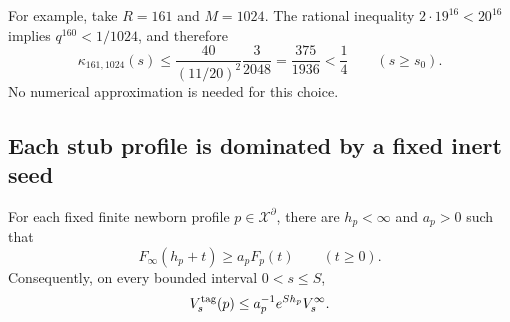 For example, take $R=161$ and $M=1024$.  The rational inequality
$2\cdot19^{16}<20^{16}$ implies $q^{160}<1/1024$, and therefore
\[
 \kappa_{161,1024}(s)
 \le\frac{40}{(11/20)^2}\frac3{2048}
 =\frac{375}{1936}<\frac14
 \qquad(s\ge s_0).
\]
No numerical approximation is needed for this choice.

\subsection{Each stub profile is dominated by a fixed inert seed}

\begin{lemma}
\label{cr:guardian}
For each fixed finite newborn profile $p\in\mathcal X^\partial$,
there are $h_p<\infty$ and $a_p>0$ such that
\begin{equation}
 F_\infty(h_p+t)\ge a_pF_p(t)\qquad(t\ge0).
 \label{cr:guardian-time}
\end{equation}
Consequently, on every bounded interval $0<s\le S$,
\[
 V_s^{\rm tag}(p)\le a_p^{-1}e^{Sh_p}V_s^\infty.
\]
\end{lemma}
